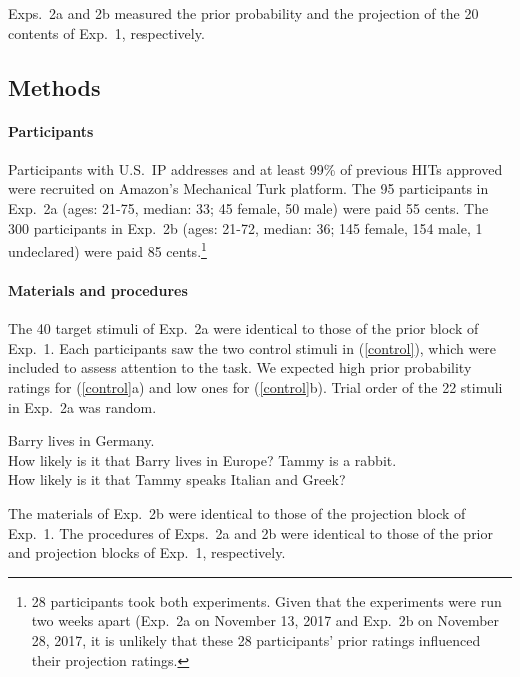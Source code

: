 \documentclass[11pt,fleqn]{article}
\newcommand{\6}{\mbox{$[\hspace*{-.6mm}[$}}
\newcommand{\9}{\mbox{$]\hspace*{-.6mm}]$}}
\begin{document}
Exps.~2a and 2b measured the prior probability and the projection of the 20 contents of Exp.~1, respectively.

\subsection{Methods}


\paragraph{Participants} Participants with U.S.\ IP addresses and at least 99\% of previous HITs approved were recruited on Amazon's Mechanical Turk platform. The 95 participants in Exp.~2a (ages: 21-75, median: 33; 45 female, 50 male) were paid 55 cents. The 300 participants in Exp.~2b (ages: 21-72, median: 36; 145 female, 154 male, 1 undeclared) were paid 85 cents.\footnote{28 participants took both experiments. Given that the experiments were run two weeks apart (Exp.~2a on November 13, 2017 and Exp.~2b on November 28, 2017, it is unlikely that these 28 participants' prior ratings influenced their projection ratings.}

\paragraph{Materials and procedures} The 40 target stimuli of Exp.~2a were identical to those of the prior block of Exp.~1. Each participants saw the two control stimuli in (\ref{control}), which were included to assess attention to the task. We expected high prior probability ratings for (\ref{control}a) and low ones for (\ref{control}b). Trial order of the 22 stimuli in Exp.~2a was random.

\begin{exe}
\ex\label{control2}
\begin{xlist}
 Barry lives in Germany. \\ How likely is it that Barry lives in Europe?
 Tammy is a rabbit. \\ How likely is it that Tammy speaks Italian and Greek?
\end{xlist}
\end{exe}
The materials of Exp.~2b were identical to those of the projection block of Exp.~1. The procedures of Exps.~2a and 2b were identical to those of the prior and projection blocks of Exp.~1, respectively.
\end{document}
